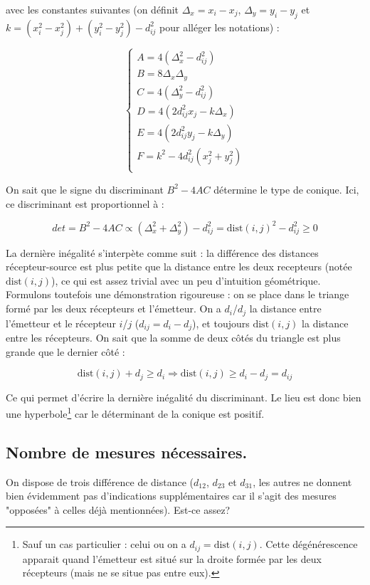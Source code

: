 \documentclass[10pt,a4paper]{article}
\begin{document}
avec les constantes suivantes (on définit $\Delta_x = x_i - x_j$, $\Delta_y = y_i - y_j$ et $k = (x_i^2 - x_j^2) + (y_i^2 - y_j^2) - d_{ij}^2$ pour alléger les notations) :


$$\begin{cases}
A = 4(\Delta_x^2 - d_{ij}^2)\\
B = 8\Delta_x \Delta_y\\
C = 4(\Delta_y^2 - d_{ij}^2)\\
D = 4(2d_{ij}^2x_j-k\Delta_x)\\
E = 4(2d_{ij}^2y_j-k\Delta_y)\\
F = k^2-4d_{ij}^2(x_j^2+y_j^2)\\
\end{cases}$$

On sait que le signe du discriminant $B^2 - 4AC$ détermine le type de conique. Ici, ce discriminant est proportionnel à :

\begin{equation}
det = B^2 - 4AC \propto (\Delta_x^2 + \Delta_y^2) - d_{ij}^2 = \mathrm{dist}(i,j)^2 - d_{ij}^2\geq 0
\end{equation}

La dernière inégalité s'interpète comme suit : la différence des distances récepteur-source est plus petite que la distance entre les deux recepteurs (notée $\mathrm{dist}(i,j)$), ce qui est assez trivial avec un peu d'intuition géométrique. Formulons toutefois une démonstration rigoureuse : on se place dans le triange formé par les deux récepteurs et l'émetteur. On a $d_i$/$d_j$ la distance entre l'émetteur et le récepteur $i$/$j$ ($d_{ij} = d_i - d_j$), et toujours $\mathrm{dist}(i,j)$ la distance entre les récepteurs. On sait que la somme de deux côtés du triangle est plus grande que le dernier côté :

\begin{equation}
\mathrm{dist}(i,j) + d_j \geq d_i \Rightarrow \mathrm{dist}(i,j) \geq d_i - d_j = d_{ij}
\end{equation}

Ce qui permet d'écrire la dernière inégalité du discriminant. Le lieu est donc bien une hyperbole\footnote{Sauf un cas particulier : celui ou on a $d_{ij} = \mathrm{dist}(i,j)$. Cette dégénérescence apparait quand l'émetteur est situé sur la droite formée par les deux récepteurs (mais ne se situe pas entre eux).} car le déterminant de la conique est positif.

\subsection{Nombre de mesures nécessaires.}
On dispose de trois différence de distance ($d_{12}$, $d_{23}$ et $d_{31}$, les autres ne donnent bien évidemment pas d'indications supplémentaires car il s'agit des mesures "opposées" à celles déjà mentionnées). Est-ce assez?
\end{document}
